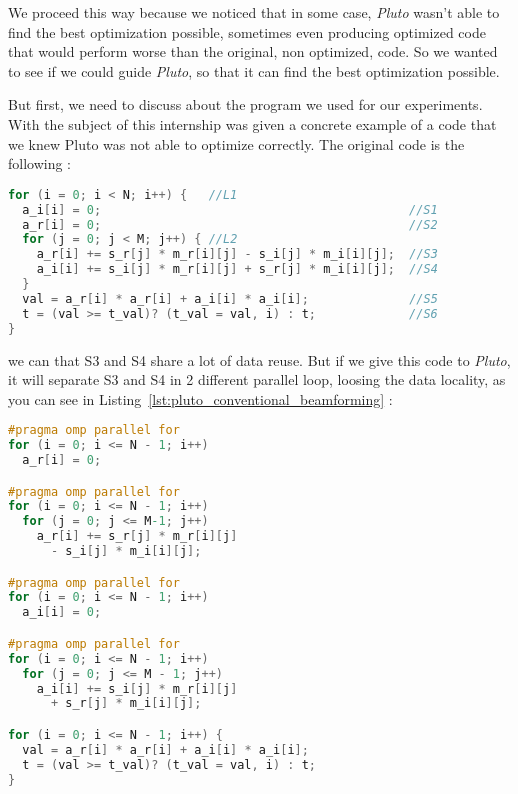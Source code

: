 \documentclass[paper=a4, fontsize=11.5pt]{scrartcl}
\numberwithin{equation}{section}        %
\numberwithin{figure}{section}          %
\numberwithin{table}{section}               %
\begin{document}
We proceed this way because we noticed that in some case, \textit{Pluto} wasn't able
to find the best optimization possible, sometimes even producing optimized code that would
perform worse than the original, non optimized, code. So we wanted to see if we could
guide \textit{Pluto}, so that it can find the best optimization possible.

But first, we need to discuss about the program we used for our experiments. With the subject
of this internship was given a concrete example of a code that we knew Pluto was not able to optimize correctly.
The original code is the following :
\begin{lstlisting}[frame=single, language=C, caption={Origin Conventional Beamforming kernel}, label={lst:original_conventional_beamforming}]
for (i = 0; i < N; i++) {   //L1
  a_i[i] = 0;                                           //S1
  a_r[i] = 0;                                           //S2
  for (j = 0; j < M; j++) { //L2
    a_r[i] += s_r[j] * m_r[i][j] - s_i[j] * m_i[i][j];  //S3
    a_i[i] += s_i[j] * m_r[i][j] + s_r[j] * m_i[i][j];  //S4
  }
  val = a_r[i] * a_r[i] + a_i[i] * a_i[i];              //S5
  t = (val >= t_val)? (t_val = val, i) : t;             //S6
}
\end{lstlisting}
we can that S3 and S4 share a lot of data reuse. But if we give this code to \textit{Pluto},
it will separate S3 and S4 in 2 different parallel loop, loosing the data locality, as you
can see in Listing~\ref{lst:pluto_conventional_beamforming} :
\begin{minipage}[t]{0.45\textwidth}
\begin{lstlisting}[frame=single, language=C, basicstyle=\scriptsize, caption={Conventional Beamforming kernel optimized by Pluto}, label={lst:pluto_conventional_beamforming}]
#pragma omp parallel for
for (i = 0; i <= N - 1; i++)
  a_r[i] = 0;

#pragma omp parallel for
for (i = 0; i <= N - 1; i++)
  for (j = 0; j <= M-1; j++)
    a_r[i] += s_r[j] * m_r[i][j]
      - s_i[j] * m_i[i][j];

#pragma omp parallel for
for (i = 0; i <= N - 1; i++)
  a_i[i] = 0;

#pragma omp parallel for
for (i = 0; i <= N - 1; i++)
  for (j = 0; j <= M - 1; j++)
    a_i[i] += s_i[j] * m_r[i][j]
      + s_r[j] * m_i[i][j];

for (i = 0; i <= N - 1; i++) {
  val = a_r[i] * a_r[i] + a_i[i] * a_i[i];
  t = (val >= t_val)? (t_val = val, i) : t;
}
\end{lstlisting}
\end{minipage}
\end{document}
